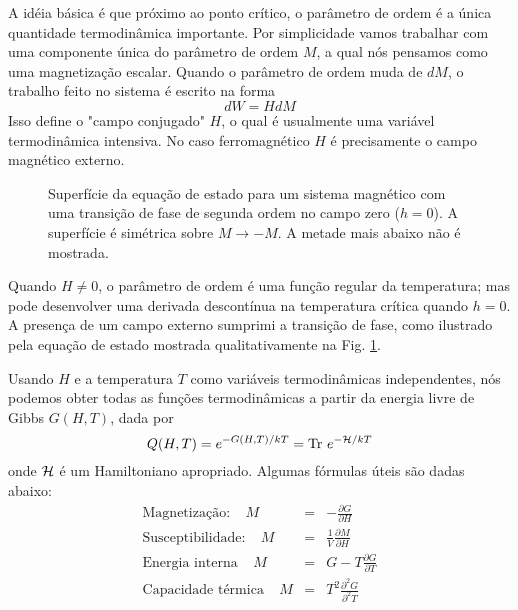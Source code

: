 A idéia básica é que próximo ao ponto crítico, o parâmetro de ordem é a única quantidade termodinâmica importante. Por simplicidade vamos trabalhar com uma componente única do parâmetro de ordem $M$, a qual nós pensamos como uma magnetização escalar. Quando o parâmetro de ordem muda de $dM$, o trabalho feito no sistema é escrito na forma
\begin{equation}
dW=HdM
\end{equation}
Isso define o "campo conjugado" $H$, o qual é usualmente uma variável termodinâmica intensiva. No caso ferromagnético $H$ é precisamente o campo magnético externo.\\
\begin{figure}[h]
\begin{center}
\renewcommand{\figurename}{{\bf Fig.}}
\caption{Superfície da equação de estado para um sistema magnético com uma transição de fase de segunda ordem no campo zero ($h=0$). A superfície é simétrica sobre $M \rightarrow -M$. A metade mais abaixo não é mostrada.}
\label{figC16_001}
\end{center}
\end{figure}
Quando $H \neq 0$, o parâmetro de ordem é uma função regular da temperatura; mas pode desenvolver uma derivada descontínua na temperatura crítica quando $h=0$. A presença de um campo externo sumprimi a transição de fase, como ilustrado pela equação de estado mostrada qualitativamente na Fig. \ref{figC16_001}.

Usando $H$ e a temperatura $T$ como variáveis termodinâmicas independentes, nós podemos obter todas as funções termodinâmicas a partir da energia livre de Gibbs $G(H,T)$, dada por
\begin{equation}
Q(H,T)=e^{-G(H,T)/kT}=\text{Tr}~e^{-{\cal H}/kT}
\end{equation}
onde ${\cal H}$ é um Hamiltoniano apropriado. Algumas fórmulas úteis são dadas abaixo:
\begin{eqnarray}
\text{Magnetização:}      ~~~~~ M&=& - \frac{\partial G}{\partial H} \\
\text{Susceptibilidade:}  ~~~~~ M&=& \frac{1}{V} \frac{\partial M}{\partial H}\\
\text{Energia interna}    ~~~~~ M&=&G - T\frac{\partial G}{\partial T}\\
\text{Capacidade térmica} ~~~~~ M&=& T^{2}\frac{\partial^{2} G}{\partial^{2} T}
\end{eqnarray}

